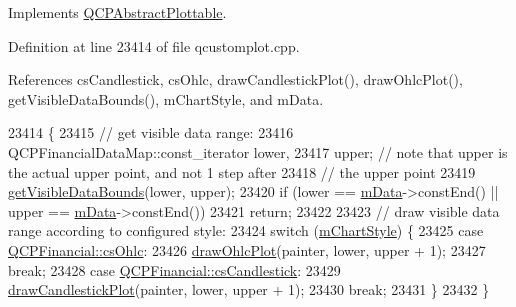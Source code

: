 Implements \hyperlink{class_q_c_p_abstract_plottable_acbab5e30dcd04fd302b4a5902ac2c482}{Q\+C\+P\+Abstract\+Plottable}.



Definition at line 23414 of file qcustomplot.\+cpp.



References cs\+Candlestick, cs\+Ohlc, draw\+Candlestick\+Plot(), draw\+Ohlc\+Plot(), get\+Visible\+Data\+Bounds(), m\+Chart\+Style, and m\+Data.


\begin{DoxyCode}
23414                                            \{
23415   \textcolor{comment}{// get visible data range:}
23416   QCPFinancialDataMap::const\_iterator lower,
23417       upper; \textcolor{comment}{// note that upper is the actual upper point, and not 1 step after}
23418              \textcolor{comment}{// the upper point}
23419   \hyperlink{class_q_c_p_financial_aca2edf9f19fae733cdb6bd4549019b84}{getVisibleDataBounds}(lower, upper);
23420   \textcolor{keywordflow}{if} (lower == \hyperlink{class_q_c_p_financial_a475f63587ca1077d8c30aaf2b71ae026}{mData}->constEnd() || upper == \hyperlink{class_q_c_p_financial_a475f63587ca1077d8c30aaf2b71ae026}{mData}->constEnd())
23421     \textcolor{keywordflow}{return};
23422 
23423   \textcolor{comment}{// draw visible data range according to configured style:}
23424   \textcolor{keywordflow}{switch} (\hyperlink{class_q_c_p_financial_ab65c2ce8d6354451870bb44b894c1e92}{mChartStyle}) \{
23425   \textcolor{keywordflow}{case} \hyperlink{class_q_c_p_financial_a0f800e21ee98d646dfc6f8f89d10ebfba3a516016c9298d3e95dd82aa203c4390}{QCPFinancial::csOhlc}:
23426     \hyperlink{class_q_c_p_financial_a3c3007a7434e29d042c77ccf4f497e66}{drawOhlcPlot}(painter, lower, upper + 1);
23427     \textcolor{keywordflow}{break};
23428   \textcolor{keywordflow}{case} \hyperlink{class_q_c_p_financial_a0f800e21ee98d646dfc6f8f89d10ebfbac803cbd39f26e3f206bcc7028679e62f}{QCPFinancial::csCandlestick}:
23429     \hyperlink{class_q_c_p_financial_a71f5081da0e5ab9c40a488ad40cff122}{drawCandlestickPlot}(painter, lower, upper + 1);
23430     \textcolor{keywordflow}{break};
23431   \}
23432 \}
\end{DoxyCode}


